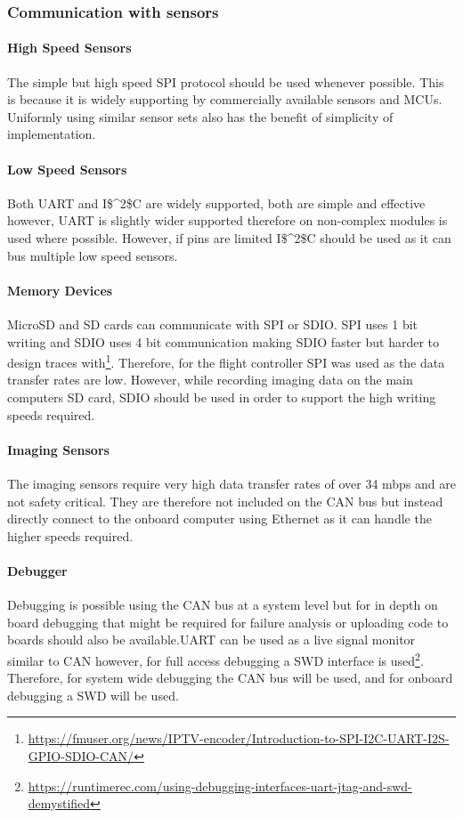 \subsubsection{Communication with sensors}
\paragraph{High Speed Sensors}
The simple but high speed \gls{SPI} protocol should be used whenever possible. This is because it is widely supporting by commercially available sensors and \gls{MCU}s. Uniformly using similar sensor sets also has the benefit of simplicity of implementation.
\paragraph{Low Speed Sensors}
Both \gls{UART} and \gls{I$^2$C} are widely supported, both are simple and effective however, \gls{UART} is slightly wider supported therefore on non-complex modules is used where possible. However, if pins are limited \gls{I$^2$C} should be used as it can bus multiple low speed sensors.
\paragraph{Memory Devices}
MicroSD and SD cards can communicate with \gls{SPI} or \gls{SDIO}. \gls{SPI} uses 1 bit writing and \gls{SDIO} uses 4 bit communication making \gls{SDIO} faster but harder to design traces with\footnote{\url{https://fmuser.org/news/IPTV-encoder/Introduction-to-SPI-I2C-UART-I2S-GPIO-SDIO-CAN/}}. Therefore, for the flight controller \gls{SPI} was used as the data transfer rates are low. However, while recording imaging data on the main computers SD card, \gls{SDIO} should be used in order to support the high writing speeds required. 
\paragraph{Imaging Sensors}
The imaging sensors require very high data transfer rates of over 34 mbps and are not safety critical. They are therefore not included on the \gls{CAN} bus but instead directly connect to the onboard computer using Ethernet as it can handle the higher speeds required.
\paragraph{Debugger}
Debugging is possible using the \gls{CAN} bus at a system level but for in depth on board debugging that might be required for failure analysis or uploading code to boards should also be available.\gls{UART} can be used as a live signal monitor similar to CAN however, for full access debugging a \gls{SWD} interface is used\footnote{\url{https://runtimerec.com/using-debugging-interfaces-uart-jtag-and-swd-demystified}}. Therefore, for system wide debugging the \gls{CAN} bus will be used, and for onboard debugging a \gls{SWD} will be used.
